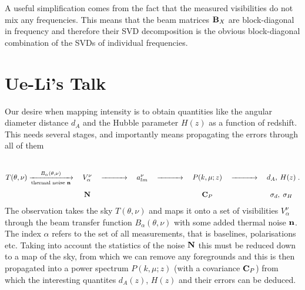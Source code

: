 \documentclass[prd,twocolumn,nofootinbib]{revtex4}
\begin{document}
A useful simplification comes from the fact that the measured visibilities do
not mix any frequencies. This means that the beam matrices $\mathbf{B}_X$ are
block-diagonal in frequency and therefore their SVD decomposition is the obvious
block-diagonal combination of the SVDs of individual frequencies.


\section{Ue-Li's Talk}

\newcommand{\vlrarrow}{\ensuremath{\xrightarrow{\qquad\quad}}}

Our desire when mapping \tcm{} intensity is to obtain quantities like the
angular diameter distance $d_A$ and the Hubble parameter $H(z)$ as a function of
redshift. This needs several stages, and importantly means propagating the
errors through all of them
\begin{equation}
  T(\theta, \nu) \xrightarrow[\text{thermal noise }\vn]{B_\alpha(\theta,\nu)} \quad \begin{matrix} \\ \\V_\alpha^\nu \\ \\ \mN\end{matrix} \quad
  \vlrarrow \quad a_{lm}^\nu  \quad \vlrarrow \quad \begin{matrix} \\ \\P(k, \mu; z) \\ \\ \mC_P \end{matrix}  \quad \vlrarrow \quad \begin{matrix} \\ \\  d_A,\: H(z)  \\ \\ \sigma_d, \; \sigma_H \end{matrix} \; .
\end{equation}
The observation takes the sky $T(\theta, \nu)$ and maps it onto a set of
visibilities $V_\alpha^\nu$ through the beam transfer function $B_\alpha(\theta,
\nu)$ with some added thermal noise $\mathbf{n}$. The index $\alpha$ refers to the set
of all measurements, that is baselines, polarisations etc. Taking into account
the statistics of the noise $\mathbf{N}$ this must be reduced down to a map of the sky,
from which we can remove any foregrounds and this is then propagated into a
power spectrum $P(k, \mu; z)$ (with a covariance $\mathbf{C}_P$) from which the
interesting quantites $d_A(z)$, $H(z)$ and their errors can be deduced.
\end{document}
